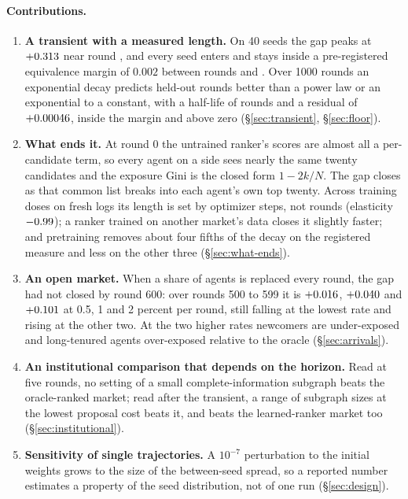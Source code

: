 \paragraph{Contributions.}
\begin{enumerate}
\item \textbf{A transient with a measured length.} On 40 seeds the gap peaks at
  $+0.313$ near round \peakRound{}, and every seed enters and stays inside a
  pre-registered equivalence margin of $0.002$ between rounds \entryMinAll{} and
  \entryMaxAll{}. Over 1000 rounds an exponential decay predicts held-out rounds
  better than a power law or an exponential to a constant, with a half-life of
  \halfLife{} rounds and a residual of $+0.00046$, inside the margin and above
  zero (\S\ref{sec:transient}, \S\ref{sec:floor}).
\item \textbf{What ends it.} At round 0 the untrained ranker's scores are almost
  all a per-candidate term, so every agent on a side sees nearly the same twenty
  candidates and the exposure Gini is the closed form $1 - 2k/N$. The gap closes
  as that common list breaks into each agent's own top twenty. Across training doses on fresh
  logs its length is set by optimizer steps, not rounds (elasticity
  $-0.99$); a ranker trained on another market's data closes it slightly
  faster; and pretraining removes about four fifths of the decay on the registered
  measure and less on the other three (\S\ref{sec:what-ends}).
\item \textbf{An open market.} When a share of agents is replaced every round, the
  gap had not closed by round 600: over rounds 500 to 599 it is $+0.016$,
  $+0.040$ and $+0.101$ at 0.5, 1 and 2 percent per round, still falling
  at the lowest rate and rising at the other two. At the two higher rates
  newcomers are under-exposed and long-tenured agents over-exposed relative to the
  oracle (\S\ref{sec:arrivals}).
\item \textbf{An institutional comparison that depends on the horizon.} Read at
  five rounds, no setting of a small complete-information subgraph beats the
  oracle-ranked market; read after the transient, a range of subgraph sizes at the
  lowest proposal cost beats it, and beats the learned-ranker market too
  (\S\ref{sec:institutional}).
\item \textbf{Sensitivity of single trajectories.} A $10^{-7}$ perturbation to the
  initial weights grows to the size of the between-seed spread, so a reported
  number estimates a property of the seed distribution, not of one run
  (\S\ref{sec:design}).
\end{enumerate}

